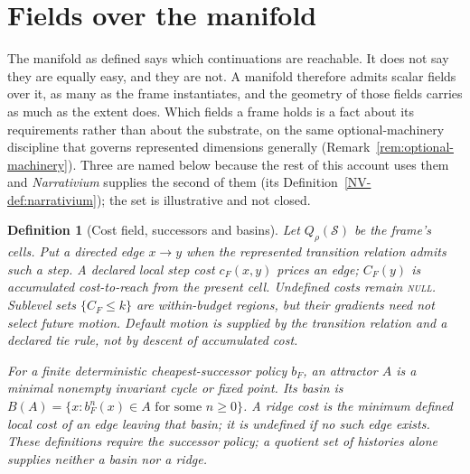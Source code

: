 \documentclass[11pt,a4paper]{article}
\newtheorem{definition}{Definition}[section]
\theoremstyle{remark}
\newcommand{\Seldon}{\mathcal S}
\begin{document}
\section{Fields over the manifold}\label{sec:contours}

The manifold as defined says which continuations are reachable. It does not say they are equally
easy, and they are not. A manifold therefore admits scalar fields over it, as many as the frame
instantiates, and the geometry of those fields carries as much as the extent does. Which fields a
frame holds is a fact about its requirements rather than about the substrate, on the same
optional-machinery discipline that governs represented dimensions generally
(Remark~\ref{rem:optional-machinery}). Three are named below because the rest of this account uses
them and \emph{Narrativium} supplies the second of them (its
Definition~\ref{NV-def:narrativium}); the set is illustrative and not closed.

\begin{definition}[Cost field, successors and basins]\label{def:contours}
Let $Q_\rho(\Seldon)$ be the frame's cells. Put a directed edge $x\to y$
when the represented transition relation admits such a step. A declared local
step cost $c_F(x,y)$ prices an edge; $C_F(y)$ is accumulated cost-to-reach
from the present cell. Undefined costs remain \textsc{null}. Sublevel sets
$\{C_F\le k\}$ are within-budget regions, but their gradients need not
select future motion. Default motion is supplied by the transition relation
and a declared tie rule, not by descent of accumulated cost.

For a finite deterministic cheapest-successor policy $b_F$, an attractor
$A$ is a minimal nonempty invariant cycle or fixed point. Its basin is
$B(A)=\{x:b_F^n(x)\in A\text{ for some }n\ge0\}$. A ridge cost is the
minimum defined local cost of an edge leaving that basin; it is undefined
if no such edge exists. These definitions require the successor policy;
a quotient set of histories alone supplies neither a basin nor a ridge.
\end{definition}
\end{document}
